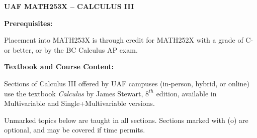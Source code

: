 \documentclass[12 pt]{article}
\begin{document}
	\begin{center}
\textbf{UAF MATH253X -- CALCULUS III}
	\end{center}

\noindent
{\bf Prerequisites:}

			Placement into MATH253X is through credit for  MATH252X with a grade of C- or better, or by the BC Calculus AP exam.
						
\bigskip


\noindent
{\bf Textbook and Course Content:}

Sections of Calculus III offered by UAF campuses (in-person, hybrid, or online) use the textbook \emph{Calculus} by James Stewart, $8^{th}$ edition, available in Multivariable and  Single+Multivariable versions.  

Unmarked topics below are taught in all sections. Sections marked with (o) are optional, and may be covered if time permits. 
		
		
		
\end{document}
